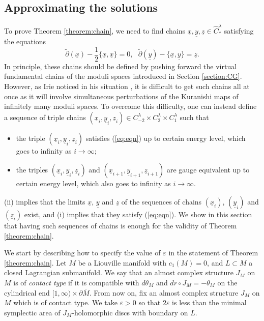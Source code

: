 \documentclass[a4paper]{article}
\numberwithin{equation}{section}
\begin{document}
\subsection{Approximating the solutions}\label{section:approximation}

To prove Theorem \ref{theorem:chain}, we need to find chains $\underline{x},\underline{y},\underline{z}\in\widehat{C}_\ast^\lambda$ satisfying the equations
\begin{equation}\label{eq:eqn}
\tilde{\partial}(\underline{x})-\frac{1}{2}\{\underline{x},\underline{x}\}=0,\textrm{ }\tilde{\partial}(\underline{y})-\{\underline{x},\underline{y}\}=\underline{z}.
\end{equation}
In principle, these chains should be defined by pushing forward the virtual fundamental chains of the moduli spaces introduced in Section \ref{section:CG}. However, as Irie noticed in his situation \cite{ki2}, it is difficult to get such chains all at once as it will involve simultaneous perturbations of the Kuranishi maps of infinitely many moduli spaces. To overcome this difficulty, one can instead define a sequence of triple chains $(\underline{x}_i,\underline{y}_i,\underline{z}_i)\in C_{-2}^\lambda\times C_2^\lambda\times C_1^\lambda$ such that
\begin{itemize}
	\item[(i)] the triple $(\underline{x}_i,\underline{y}_i,\underline{z}_i)$ satisfies (\ref{eq:eqn}) up to certain energy level, which goes to infinity as $i\rightarrow\infty$;
    \item[(ii)] the triples $(\underline{x}_i,\underline{y}_i,\underline{z}_i)$ and $(\underline{x}_{i+1},\underline{y}_{i+1},\underline{z}_{i+1})$ are gauge equivalent up to certain energy level, which also goes to infinity as $i\rightarrow\infty$.
\end{itemize}
(ii) implies that the limits $\underline{x}$, $\underline{y}$ and $\underline{z}$ of the sequences of chains $(\underline{x}_i)$, $(\underline{y}_i)$ and $(\underline{z}_i)$ exist, and (i) implies that they satisfy (\ref{eq:eqn}). We show in this section that having such sequences of chains is enough for the validity of Theorem \ref{theorem:chain}.

We start by describing how to specify the value of $\varepsilon$ in the statement of Theorem \ref{theorem:chain}. Let $M$ be a Liouville manifold with $c_1(M)=0$, and $L\subset M$ a closed Lagrangian submanifold. We say that an almost complex structure $J_M$ on $M$ is of \textit{contact type} if it is compatible with $d\theta_M$ and $dr\circ J_M=-\theta_M$ on the cylindrical end $[1,\infty)\times\partial\overline{M}$. From now on, fix an almost complex structure $J_M$ on $M$ which is of contact type. We take $\varepsilon>0$ so that $2\varepsilon$ is less than the minimal symplectic area of $J_M$-holomorphic discs with boundary on $L$.
\end{document}
